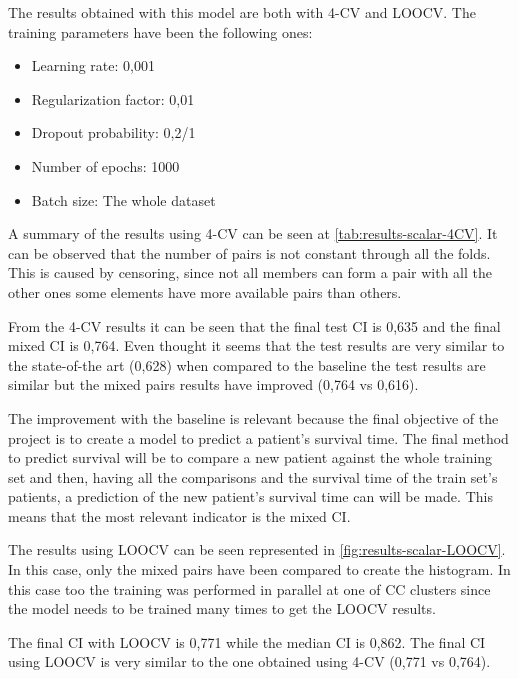 
The results obtained with this model are both with 4-CV and \gls{LOOCV}. The training 
parameters have been the following ones:
\begin{itemize}
  \item Learning rate: 0,001
  \item Regularization factor: 0,01
  \item Dropout probability: 0,2/1
  \item Number of epochs: 1000
  \item Batch size: The whole dataset
\end{itemize}

A summary of the results using 4-CV can be seen at \autoref{tab:results-scalar-4CV}. It can be
observed that the number of pairs is not constant through all the folds. This is caused by
censoring, since not all members can form a pair with all the other ones some elements 
have more available pairs than others. 

From the 4-CV results it can be seen that the final test \gls{CI} is 0,635 and the final mixed 
\gls{CI} is 0,764. Even thought it seems that the test results are very similar to the
state-of-the art (0,628) when compared to the baseline the test results are similar but
the mixed pairs results have improved (0,764 vs 0,616).

The improvement with the baseline is relevant because the final objective of the project
is to create a model to predict a patient's survival time. The final method to predict
survival will be to compare a new patient against the whole training set and then, having
all the comparisons and the survival time of the train set's patients, a prediction of
the new patient's survival time can will be made. This means that the most relevant 
indicator is the mixed \gls{CI}.

The results using \gls{LOOCV} can be seen represented in \autoref{fig:results-scalar-LOOCV}. 
In this case, only the mixed pairs have been compared to create the histogram. In this case
too the training was performed in parallel at one of \gls{CC} clusters since the model needs 
to be trained many times to get the \gls{LOOCV} results.

The final \gls{CI} with \gls{LOOCV} is 0,771 while the median \gls{CI} is 0,862. The final 
\gls{CI} using \gls{LOOCV} is very similar to the one obtained using 4-CV (0,771 vs 0,764).

